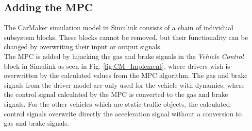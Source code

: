\documentclass[letterpaper,10pt,conference]{ieeeconf}
\begin{document}
\subsection{Adding the MPC}
The CarMaker simulation model in Simulink consists of a chain of individual subsystem blocks. These blocks cannot be removed, but their functionality can be changed by overwriting their input or output signals.\\ \indent
The MPC is added by hijacking the gas and brake signals in the \textit{Vehicle Control} block in Simulink as seen in Fig. \ref{fig:CM_Implement}, where drivers wish is overwritten by the calculated values from the MPC algorithm. The gas and brake signals from the driver model are only used for the vehicle with dynamics, where the control signal calculated by the MPC is converted to the gas and brake signals. For the other vehicles which are static traffic objects, the calculated control signals overwrite directly the acceleration signal without a conversion to gas and brake signals.

\end{document}
